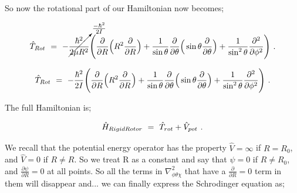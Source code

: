 \documentclass{article}
\begin{document}
So now the rotational part of our Hamiltonian now becomes; 

\begin{equation} \label{eq:256}
\hat{T}_{Rot} \hspace{0.125cm} = \hspace{0.125cm} - \cancelto{\frac{- \hbar^{2}}{2 I}}{\frac{\hbar^{2}}{2 \mu R^2}} \Bigg( \frac{\partial}{\partial{R}}\Big( R^2 \frac{\partial}{\partial{R}}\Big) + \frac{1}{\sin{\theta}} \frac{\partial}{\partial{\theta}}\Big(\sin{\theta}\frac{\partial}{\partial{\theta}}\Big) + \frac{1}{\sin^{2}{\theta}} \frac{\partial^{2}}{\partial{\phi}^{2}} \Bigg) \hspace{0.125cm} .
\end{equation}

\begin{equation} \label{eq:256}
\hat{T}_{Rot} \hspace{0.125cm} = \hspace{0.125cm} -\frac{\hbar^{2}}{2 I} \Bigg(\frac{\partial}{\partial{R}}\Big( R^2 \frac{\partial}{\partial{R}}\Big) + \frac{1}{\sin{\theta}} \frac{\partial}{\partial{\theta}}\Big(\sin{\theta}\frac{\partial}{\partial{\theta}}\Big) + \frac{1}{\sin^{2}{\theta}} \frac{\partial^{2}}{\partial{\phi}^{2}} \Bigg) \hspace{0.125cm} .
\end{equation}

The full Hamiltonian is;

\begin{equation} \label{eq:256}
\hat{H}_{RigidRotor} \hspace{0.125cm} = \hspace{0.125cm} \hat{T}_{rot} + \hat{V}_{pot} \hspace{0.125cm}. 
\end{equation}

We recall that the potential energy operator has the property \begin{math} \hat{V} = \infty \end{math} if \begin{math} R = R_0 \end{math}, and \begin{math} \hat{V} = 0 \end{math} if \begin{math} R  \neq R \end{math}. So we treat R as a constant and say that \begin{math} \psi = 0 \end{math} if \begin{math} R \neq R_0 \end{math}, and \begin{math} \frac{\partial{\psi}}{\partial{R}} = 0 \end{math} at all points. So all the terms in \begin{math} \nabla_{\phi \theta \chi}^{2} \end{math} that have a \begin{math} \frac{\partial}{\partial{R}} = 0 \end{math} term in them will disappear and... we can finally express the Schrodinger equation as;
\end{document}

